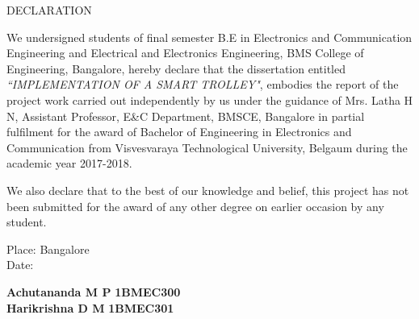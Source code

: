 {\fontsize{16pt}{19.2pt}\selectfont\bf{\begin{center}
DECLARATION
\end{center}}}

\vspace*{1cm}

We undersigned students of final semester B.E in Electronics and Communication Engineering and Electrical and Electronics Engineering, BMS College of Engineering, Bangalore, hereby declare that the dissertation entitled \textit{``IMPLEMENTATION OF A SMART TROLLEY"}, embodies the report of the project work carried out independently by us under the guidance of Mrs. Latha H N, Assistant Professor,  E\&C Department, BMSCE, Bangalore in partial fulfilment for the award of Bachelor of Engineering in Electronics and Communication from Visvesvaraya Technological University, Belgaum during the academic year 2017-2018.

We also declare that to the best of our knowledge and belief, this project has not been submitted for the award of any other degree on earlier occasion by any student.

\vspace*{1cm}

\begin{flushleft}
Place: Bangalore \\
Date: 
\end{flushleft}

\vspace*{1cm}

\begin{flushright}
{\fontsize{14pt}{16.8pt}\selectfont\textbf{Achutananda M P}}  \hspace*{12mm} {\fontsize{14pt}{16.8pt}\selectfont\textbf{1BMEC300}}\\
\vspace*{3mm}
{\fontsize{14pt}{16.8pt}\selectfont\textbf{Harikrishna D M}}  \hspace*{12mm} {\fontsize{14pt}{16.8pt}\selectfont\textbf{1BMEC301}}\\
\end{flushright}


